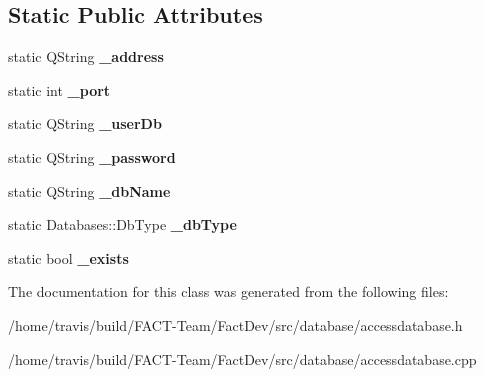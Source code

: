 \subsection*{Static Public Attributes}
\begin{DoxyCompactItemize}
\item 
\hypertarget{classDatabases_1_1AccessDatabase_a55d2effa9db8712ed59e1c812d0976a5}{static Q\-String {\bfseries \-\_\-address}}\label{classDatabases_1_1AccessDatabase_a55d2effa9db8712ed59e1c812d0976a5}

\item 
\hypertarget{classDatabases_1_1AccessDatabase_a3a0d5ea34848774e22513478bc8f2438}{static int {\bfseries \-\_\-port}}\label{classDatabases_1_1AccessDatabase_a3a0d5ea34848774e22513478bc8f2438}

\item 
\hypertarget{classDatabases_1_1AccessDatabase_ab8bce721fe627ad70763584d590c74f0}{static Q\-String {\bfseries \-\_\-user\-Db}}\label{classDatabases_1_1AccessDatabase_ab8bce721fe627ad70763584d590c74f0}

\item 
\hypertarget{classDatabases_1_1AccessDatabase_a8784a122fe511b200fd8e2fa1c327ac6}{static Q\-String {\bfseries \-\_\-password}}\label{classDatabases_1_1AccessDatabase_a8784a122fe511b200fd8e2fa1c327ac6}

\item 
\hypertarget{classDatabases_1_1AccessDatabase_a754d01d8f769d85e360f6a06380ff4a9}{static Q\-String {\bfseries \-\_\-db\-Name}}\label{classDatabases_1_1AccessDatabase_a754d01d8f769d85e360f6a06380ff4a9}

\item 
\hypertarget{classDatabases_1_1AccessDatabase_a45087af6b64738f00a5338e32887ce91}{static Databases\-::\-Db\-Type {\bfseries \-\_\-db\-Type}}\label{classDatabases_1_1AccessDatabase_a45087af6b64738f00a5338e32887ce91}

\item 
\hypertarget{classDatabases_1_1AccessDatabase_a4041377d9c32522f62a70d750d34e581}{static bool {\bfseries \-\_\-exists}}\label{classDatabases_1_1AccessDatabase_a4041377d9c32522f62a70d750d34e581}

\end{DoxyCompactItemize}


The documentation for this class was generated from the following files\-:\begin{DoxyCompactItemize}
\item 
/home/travis/build/\-F\-A\-C\-T-\/\-Team/\-Fact\-Dev/src/database/accessdatabase.\-h\item 
/home/travis/build/\-F\-A\-C\-T-\/\-Team/\-Fact\-Dev/src/database/accessdatabase.\-cpp\end{DoxyCompactItemize}
